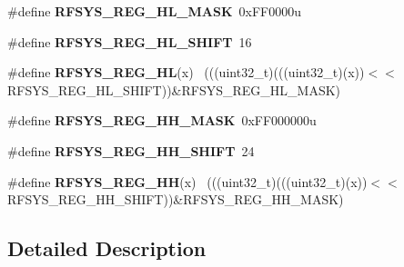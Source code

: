 \begin{DoxyCompactItemize}
\item 
\hypertarget{group___r_f_s_y_s___register___masks_ga063f595b6c7267627c96048590611cc1}{}\#define {\bfseries R\+F\+S\+Y\+S\+\_\+\+R\+E\+G\+\_\+\+H\+L\+\_\+\+M\+A\+S\+K}~0x\+F\+F0000u\label{group___r_f_s_y_s___register___masks_ga063f595b6c7267627c96048590611cc1}

\item 
\hypertarget{group___r_f_s_y_s___register___masks_gabc34a2d1963a697d1a773a8981a063f5}{}\#define {\bfseries R\+F\+S\+Y\+S\+\_\+\+R\+E\+G\+\_\+\+H\+L\+\_\+\+S\+H\+I\+F\+T}~16\label{group___r_f_s_y_s___register___masks_gabc34a2d1963a697d1a773a8981a063f5}

\item 
\hypertarget{group___r_f_s_y_s___register___masks_ga2181a8fe6350e129761edcd07b9be025}{}\#define {\bfseries R\+F\+S\+Y\+S\+\_\+\+R\+E\+G\+\_\+\+H\+L}(x)                                                ~(((uint32\+\_\+t)(((uint32\+\_\+t)(x))$<$$<$R\+F\+S\+Y\+S\+\_\+\+R\+E\+G\+\_\+\+H\+L\+\_\+\+S\+H\+I\+F\+T))\&R\+F\+S\+Y\+S\+\_\+\+R\+E\+G\+\_\+\+H\+L\+\_\+\+M\+A\+S\+K)\label{group___r_f_s_y_s___register___masks_ga2181a8fe6350e129761edcd07b9be025}

\item 
\hypertarget{group___r_f_s_y_s___register___masks_gae1fb55483b3d79a2e74d0c1ad4e57d51}{}\#define {\bfseries R\+F\+S\+Y\+S\+\_\+\+R\+E\+G\+\_\+\+H\+H\+\_\+\+M\+A\+S\+K}~0x\+F\+F000000u\label{group___r_f_s_y_s___register___masks_gae1fb55483b3d79a2e74d0c1ad4e57d51}

\item 
\hypertarget{group___r_f_s_y_s___register___masks_gae78b067bd28db1d0ff57015f300312fb}{}\#define {\bfseries R\+F\+S\+Y\+S\+\_\+\+R\+E\+G\+\_\+\+H\+H\+\_\+\+S\+H\+I\+F\+T}~24\label{group___r_f_s_y_s___register___masks_gae78b067bd28db1d0ff57015f300312fb}

\item 
\hypertarget{group___r_f_s_y_s___register___masks_ga7d696d8c5f250e7f2a9f11607bbc8506}{}\#define {\bfseries R\+F\+S\+Y\+S\+\_\+\+R\+E\+G\+\_\+\+H\+H}(x)                                                ~(((uint32\+\_\+t)(((uint32\+\_\+t)(x))$<$$<$R\+F\+S\+Y\+S\+\_\+\+R\+E\+G\+\_\+\+H\+H\+\_\+\+S\+H\+I\+F\+T))\&R\+F\+S\+Y\+S\+\_\+\+R\+E\+G\+\_\+\+H\+H\+\_\+\+M\+A\+S\+K)\label{group___r_f_s_y_s___register___masks_ga7d696d8c5f250e7f2a9f11607bbc8506}

\end{DoxyCompactItemize}


\subsection{Detailed Description}
